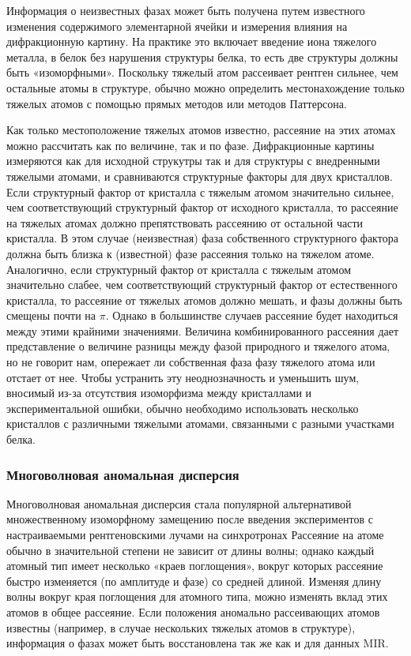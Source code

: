 \documentclass{article}
\begin{document}
Информация о неизвестных фазах может быть получена путем известного изменения содержимого элементарной ячейки и измерения влияния на дифракционную картину. На практике это включает введение иона тяжелого металла, в белок без нарушения структуры белка, то есть две структуры должны быть «изоморфными». Поскольку тяжелый атом рассеивает рентген сильнее, чем остальные атомы в структуре, обычно можно определить местонахождение только тяжелых атомов с помощью прямых методов или методов Паттерсона.

Как только местоположение тяжелых атомов известно, рассеяние на этих атомах можно рассчитать как по величине, так и по фазе. Дифракционные картины измеряются как для исходной струкутры так и для структуры с внедренными тяжелыми атомами, и сравниваются структурные факторы для двух кристаллов. Если структурный фактор от кристалла с тяжелым атомом значительно сильнее, чем соответствующий структурный фактор от исходного кристалла, то рассеяние на тяжелых атомах должно препятствовать рассеянию от остальной части кристалла. В этом случае (неизвестная) фаза собственного структурного фактора должна быть близка к (известной) фазе рассеяния только на тяжелом атоме.
Аналогично, если структурный фактор от кристалла с тяжелым атомом значительно слабее, чем соответствующий структурный фактор от естественного кристалла, то рассеяние от тяжелых атомов должно мешать, и фазы должны быть смещены почти на $\pi$. Однако в большинстве случаев рассеяние будет находиться между этими крайними значениями. Величина комбинированного рассеяния дает представление о величине разницы между фазой природного и тяжелого атома, но не говорит нам, опережает ли собственная фаза фазу тяжелого атома или отстает от нее. Чтобы устранить эту неоднозначность и уменьшить шум, вносимый из-за отсутствия изоморфизма между кристаллами и экспериментальной ошибки, обычно необходимо использовать несколько кристаллов с различными тяжелыми атомами, связанными с разными участками белка\cite{ProtXR}.

\subsubsection{Многоволновая аномальная дисперсия}

Многоволновая аномальная дисперсия стала популярной альтернативой множественному изоморфному замещению после введения экспериментов с настраиваемыми рентгеновскими лучами на синхротронах\cite{Hendrickson1997}
 Рассеяние на атоме обычно в значительной степени не зависит от длины волны; однако каждый атомный тип имеет несколько «краев поглощения», вокруг которых рассеяние быстро изменяется (по амплитуде и фазе) со средней длиной. Изменяя длину волны вокруг края поглощения для атомного типа, можно изменять вклад этих атомов в общее рассеяние.  Если положения аномально рассеивающих атомов известны  (например, в случае нескольких тяжелых атомов в структуре), информация о фазах может быть восстановлена так же как и для данных MIR\cite{Hendrickson1997}.
\end{document}
